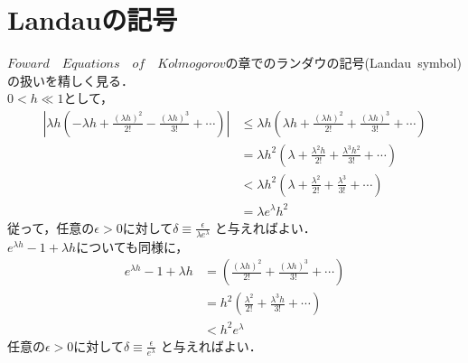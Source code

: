 \documentclass[a4j,papersize,disablejfam,slide,14pt]{jsarticle}
\def\exp#1{e^{#1}} %
\begin{document}
\section{{\rm Landau}の記号}
\label{sec:appendix_landau}
	$Foward\quad Equations\quad of\quad Kolmogorov$の章でのランダウの記号{\rm (Landau\ symbol)}の扱いを精しく見る．\\
	$0 < h \ll 1$として，
    \begin{align}
    	\left| \lambda h \left(- \lambda h + \frac{(\lambda h)^2}{2!} - \frac{(\lambda h)^3}{3!} + \cdots \right) \right|
        &\leq \lambda h \left(\lambda h + \frac{(\lambda h)^2}{2!} + \frac{(\lambda h)^3}{3!} + \cdots \right) \\
        &= \lambda h^2 \left(\lambda + \frac{\lambda^2 h}{2!} + \frac{\lambda^3 h^2}{3!} + \cdots \right) \\
        &< \lambda h^2 \left(\lambda + \frac{\lambda^2}{2!} + \frac{\lambda^3}{3!} + \cdots \right) \\
        &= \lambda \exp{\lambda} h^2
    \end{align}
    従って，任意の$\epsilon > 0$に対して$\delta \equiv \frac{\epsilon}{\lambda \exp{\lambda}}$ と与えればよい．\\
    $\exp{\lambda h} - 1 + \lambda h$についても同様に，
    \begin{align}
    	\exp{\lambda h} - 1 + \lambda h &= \left(\frac{(\lambda h)^2}{2!} + \frac{(\lambda h)^3}{3!} + \cdots \right) \\
        &= h^2 \left(\frac{\lambda^2}{2!} + \frac{\lambda^3 h}{3!} + \cdots \right) \\
        &< h^2 \exp{\lambda}
    \end{align}
    任意の$\epsilon > 0$に対して$\delta \equiv \frac{\epsilon}{\exp{\lambda}}$ と与えればよい．
\end{document}
